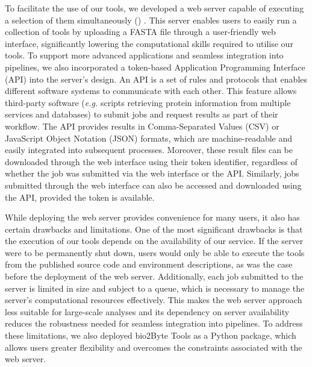 To facilitate the use of our tools, we developed a web server capable of executing a selection of them simultaneously () \cite{kagami_b2btools_2021}. This server enables users to easily run a collection of tools by uploading a FASTA file through a user-friendly web interface, significantly lowering the computational skills required to utilise our tools. To support more advanced applications and seamless integration into pipelines, we also incorporated a token-based Application Programming Interface (API) into the server’s design. An API is a set of rules and protocols that enables different software systems to communicate with each other. This feature allows third-party software (\textit{e.g.} scripts retrieving protein information from multiple services and databases) to submit jobs and request results as part of their workflow. The API provides results in Comma-Separated Values (CSV) or JavaScript Object Notation (JSON) formats, which are machine-readable and easily integrated into subsequent processes. Moreover, these result files can be downloaded through the web interface using their token identifier, regardless of whether the job was submitted via the web interface or the API. Similarly, jobs submitted through the web interface can also be accessed and downloaded using the API, provided the token is available.

While deploying the web server provides convenience for many users, it also has certain drawbacks and limitations. One of the most significant drawbacks is that the execution of our tools depends on the availability of our service. If the server were to be permanently shut down, users would only be able to execute the tools from the published source code and environment descriptions, as was the case before the deployment of the web server. Additionally, each job submitted to the server is limited in size and subject to a queue, which is necessary to manage the server's computational resources effectively. This makes the web server approach less suitable for large-scale analyses and its dependency on server availability reduces the robustness needed for seamless integration into pipelines. To address these limitations, we also deployed bio2Byte Tools as a Python package, which allows users greater flexibility and overcomes the constraints associated with the web server.


